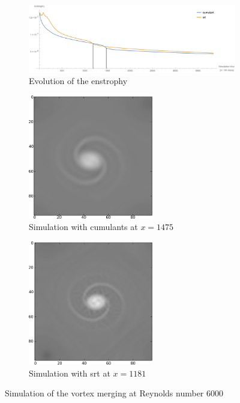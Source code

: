 \begin{figure}
\centering
\begin{subfigure}[b]{\textwidth}
  \centering
  \includegraphics[width=\textwidth]{../figures/vortexMerge_enstrophy.pdf}  %
  \caption{Evolution of the enstrophy}
\label{fig: rankine result}
\end{subfigure}%

\medskip
\begin{subfigure}[b]{.5\textwidth}
  \centering
  \includegraphics[width=0.6\textwidth]{../figures/cumulant_Re6000_size96_1475.png}  %
  \caption{Simulation with cumulants at  $x=1475$}
\label{fig: rankine cumulant}
\end{subfigure}\begin{subfigure}[b]{.5\textwidth}
  \centering
  \includegraphics[width=0.6\textwidth]{../figures/srt_Re6000_size96_1181.png}  %
  \caption{Simulation with \gls{srt} at  $x=1181$}
\label{fig: rankine srt}
\end{subfigure}

\caption{Simulation of the vortex merging at Reynolds number $6000$}
\label{fig: rankine 6000}
\end{figure}


